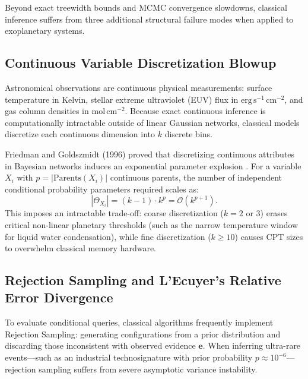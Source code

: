 Beyond exact treewidth bounds and MCMC convergence slowdowns, classical inference suffers from three additional structural failure modes when applied to exoplanetary systems.

\subsection{Continuous Variable Discretization Blowup}
Astronomical observations are continuous physical measurements: surface temperature in Kelvin, stellar extreme ultraviolet (EUV) flux in $\mathrm{erg}\,\mathrm{s}^{-1}\,\mathrm{cm}^{-2}$, and gas column densities in $\mathrm{mol}\,\mathrm{cm}^{-2}$. Because exact continuous inference is computationally intractable outside of linear Gaussian networks, classical models discretize each continuous dimension into $k$ discrete bins.

Friedman and Goldszmidt (1996) proved that discretizing continuous attributes in Bayesian networks induces an exponential parameter explosion \cite{friedman1996}. For a variable $X_i$ with $p = |\mathrm{Parents}(X_i)|$ continuous parents, the number of independent conditional probability parameters required scales as:
\begin{equation}
|\Theta_{X_i}| = (k - 1) \cdot k^p = \mathcal{O}\left(k^{p+1}\right).
\label{eq:discretization_cpt_explosion}
\end{equation}
This imposes an intractable trade-off: coarse discretization ($k = 2$ or $3$) erases critical non-linear planetary thresholds (such as the narrow temperature window for liquid water condensation), while fine discretization ($k \ge 10$) causes CPT sizes to overwhelm classical memory hardware.

\subsection{Rejection Sampling and L'Ecuyer's Relative Error Divergence}
To evaluate conditional queries, classical algorithms frequently implement Rejection Sampling: generating configurations from a prior distribution and discarding those inconsistent with observed evidence $\mathbf{e}$. When inferring ultra-rare events---such as an industrial technosignature with prior probability $p \approx 10^{-6}$---rejection sampling suffers from severe asymptotic variance instability.


